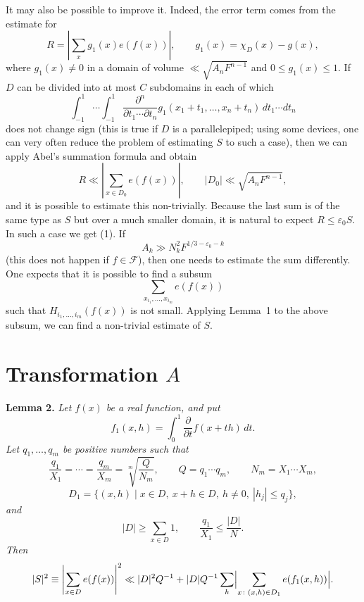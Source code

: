 \documentclass[10pt]{article}
\begin{document}
It may also be possible to improve it. Indeed, the error term comes from the estimate for
\[
  R=\left|\sum_xg_1(x)e(f(x))\right|,
  \qquad g_1(x)=\chi_D(x)-g(x),
\]
where $g_1(x)\ne0$ in a domain of volume $\ll\sqrt{A_nF^{n-1}}$ and $0\leqslant g_1(x)\leqslant1$. If $D$ can be divided into at most $C$ subdomains in each of which
\[
  \int_{-1}^{1}\cdots\int_{-1}^{1}
  \frac{\partial^n}{\partial t_1\cdots\partial t_n}
  g_1(x_1+t_1,\ldots,x_n+t_n)\,dt_1\cdots dt_n
\]
does not change sign (this is true if $D$ is a parallelepiped; using some devices, one can very often reduce the problem of estimating $S$ to such a case), then we can apply Abel's summation formula and obtain
\[
  R\ll\left|\sum_{x\in D_0}e(f(x))\right|,
  \qquad |D_0|\ll\sqrt{A_nF^{n-1}},
\]
and it is possible to estimate this non-trivially. Because the last sum is of the same type as $S$ but over a much smaller domain, it is natural to expect $R\leqslant\varepsilon_0S$. In such a case we get (1). If
\[
  A_k\gg N_k^2F^{1/3-\varepsilon_0-k}
\]
(this does not happen if $f\in\mathscr F$), then one needs to estimate the sum differently. One expects that it is possible to find a subsum
\[
  \sum_{x_{i_1},\ldots,x_{i_m}}e(f(x))
\]
such that $H_{i_1,\ldots,i_m}(f(x))$ is not small. Applying Lemma~1 to the above subsum, we can find a non-trivial estimate of $S$.

\section{Transformation $A$}

\medskip
\noindent\textbf{Lemma 2.}
\textit{Let $f(x)$ be a real function, and put
\[
  f_1(x,h)=\int_0^1\frac{\partial}{\partial t}f(x+th)\,dt.
\]
Let $q_1,\ldots,q_m$ be positive numbers such that
\[
  \frac{q_1}{X_1}=\cdots=\frac{q_m}{X_m}=\sqrt[m]{\frac Q{N_m}},
  \qquad Q=q_1\cdots q_m,
  \qquad N_m=X_1\cdots X_m,
\]
\[
  D_1=\{(x,h)\mid x\in D,\ x+h\in D,\ h\ne0,\ |h_j|\leqslant q_j\},
\]
and
\[
  |D|\geqslant\sum_{x\in D}1,
  \qquad \frac{q_1}{X_1}\leqslant\frac{|D|}{N}.
\]
Then
\[
  |S|^2\equiv\left|\sum_{x\in D}e(f(x))\right|^2
  \ll |D|^2Q^{-1}+|D|Q^{-1}
  \sum_{h}\Bigl|\sum_{x\colon(x,h)\in D_1}e(f_1(x,h))\Bigr|.
\]}
\end{document}
